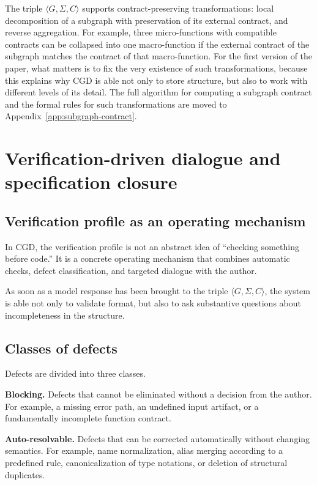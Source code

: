 \documentclass[12pt,a4paper]{article}
\begin{document}
The triple $\langle G, \Sigma, C \rangle$ supports contract-preserving transformations: local decomposition of a subgraph with preservation of its external contract, and reverse aggregation. For example, three micro-functions with compatible contracts can be collapsed into one macro-function if the external contract of the subgraph matches the contract of that macro-function. For the first version of the paper, what matters is to fix the very existence of such transformations, because this explains why CGD is able not only to store structure, but also to work with different levels of its detail. The full algorithm for computing a subgraph contract and the formal rules for such transformations are moved to Appendix~\ref{app:subgraph-contract}.

\section{Verification-driven dialogue and specification closure}

\subsection{Verification profile as an operating mechanism}

In CGD, the verification profile is not an abstract idea of ``checking something before code.'' It is a concrete operating mechanism that combines automatic checks, defect classification, and targeted dialogue with the author.

As soon as a model response has been brought to the triple $\langle G, \Sigma, C \rangle$, the system is able not only to validate format, but also to ask substantive questions about incompleteness in the structure.

\subsection{Classes of defects}

Defects are divided into three classes.

\textbf{Blocking.} Defects that cannot be eliminated without a decision from the author. For example, a missing error path, an undefined input artifact, or a fundamentally incomplete function contract.

\textbf{Auto-resolvable.} Defects that can be corrected automatically without changing semantics. For example, name normalization, alias merging according to a predefined rule, canonicalization of type notations, or deletion of structural duplicates.
\end{document}

